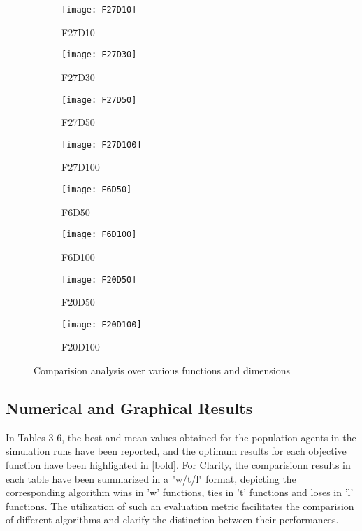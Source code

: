 \begin{figure*}[h!]
    \begin{subfigure}[b]{0.24\textwidth}
        \texttt{[image: F27D10]}
        \caption{F27D10}
    \end{subfigure}
    \begin{subfigure}[b]{0.24\textwidth}
        \texttt{[image: F27D30]}
        \caption{F27D30}
    \end{subfigure}    
    \begin{subfigure}[b]{0.24\textwidth}
        \texttt{[image: F27D50]}
        \caption{F27D50}
    \end{subfigure}
    \begin{subfigure}[b]{0.24\textwidth}
        \texttt{[image: F27D100]}
        \caption{F27D100}
    \end{subfigure}

    \begin{subfigure}[b]{0.24\textwidth}
        \texttt{[image: F6D50]}
        \caption{F6D50}
    \end{subfigure}
    \begin{subfigure}[b]{0.24\textwidth}
        \texttt{[image: F6D100]}
        \caption{F6D100}
    \end{subfigure}
    \begin{subfigure}[b]{0.24\textwidth}
        \texttt{[image: F20D50]}
        \caption{F20D50}
    \end{subfigure}
    \begin{subfigure}[b]{0.24\textwidth}
        \texttt{[image: F20D100]}
        \caption{F20D100}
    \end{subfigure}

    \caption{Comparision analysis over various functions and dimensions}
    \vspace{-4mm}
\end{figure*}


\subsection{Numerical and Graphical Results} 

In Tables 3-6, the best and mean values obtained for the population agents in the simulation runs have been reported, and the optimum results for each objective function have been highlighted in [bold]. For Clarity, the comparisionn results in each table have been summarized in a "w/t/l" format, depicting the corresponding algorithm wins in 'w' functions, ties in 't' functions and loses in 'l' functions. The utilization of such an evaluation metric facilitates the comparision of different algorithms and clarify the distinction between their performances.

